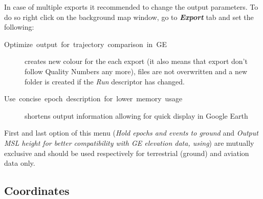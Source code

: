 \documentclass[british]{book}
\begin{document}
In case of multiple exports it recommended to change the output parameters. To do so right click on the background map window, go to \textbf{\emph{Export}} tab and set the following:
\begin{description}
	\item [{Optimize~output~for~trajectory~comparison~in~GE}] creates new colour for the each export (it also means that export don\textquoteright{}t follow Quality Numbers any more), files are not overwritten and a new folder is created if the \emph{Run} descriptor has changed.
	\item [{Use~concise~epoch~description~for~lower~memory~usage}] shortens output information allowing for quick display in Google Earth
\end{description}

First and last option of this menu (\emph{Hold epochs and events to ground }and \emph{Output MSL height for better compatibility with GE elevation data, using}) are mutually exclusive and should be used respectively for terrestrial (ground) and aviation data only.

\subsection{Coordinates}


\end{document}
